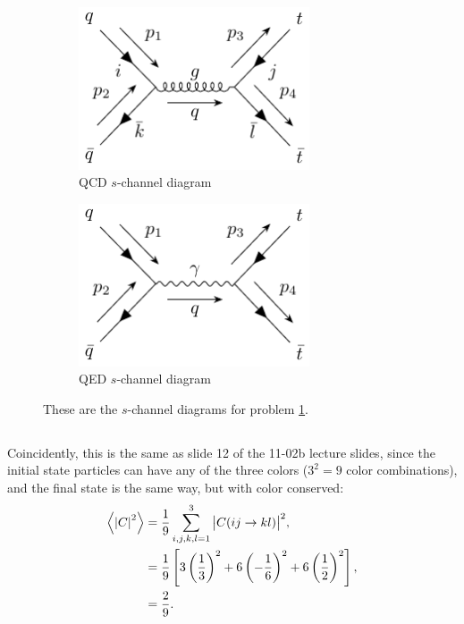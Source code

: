 \documentclass[
a4paper,
10pt,
twoside,
prd,
aps,
nofootinbib,
superscriptaddress,
floatfix,
preprintnumbers,
]{article}
\begin{document}
\section{}
\label{sec: 2}

\subsection{}
\begin{figure}[H]
	\centering
	\begin{subfigure}[t]{0.45\textwidth}
		\centering
		\caption{QCD $s$-channel diagram}
		\includegraphics[width=0.75\textwidth]{figures/prob2QCDDiag.pdf}
	\end{subfigure}
	\begin{subfigure}[t]{0.45\textwidth}
		\centering
		\caption{QED $s$-channel diagram}
		\includegraphics[width=0.75\textwidth]{figures/prob2QEDDiag.pdf}
	\end{subfigure}
	\caption{These are the $s$-channel diagrams for problem \ref{sec: 2}.}
	\label{fig: QCD feynman}
\end{figure}

\subsection{}
Coincidently, this is the same as slide 12 of the 11-02b lecture slides, since the initial state particles can have any of the three colors ($3^2 = 9$ color combinations), and the final state is the same way, but with color conserved:
\begin{align}
	\ev{\abs{C}^2} &= \frac{1}{9} \sum_{i,j,k,l=1}^3 \abs{C(ij \rightarrow kl)}^2,\\
	&= \frac{1}{9} \left[ 3\left(\frac{1}{3}\right)^2 +6\left(-\frac{1}{6}\right)^2 + 6\left(\frac{1}{2}\right)^2\right],\\
	&= \frac{2}{9}.
\end{align}
\end{document}
